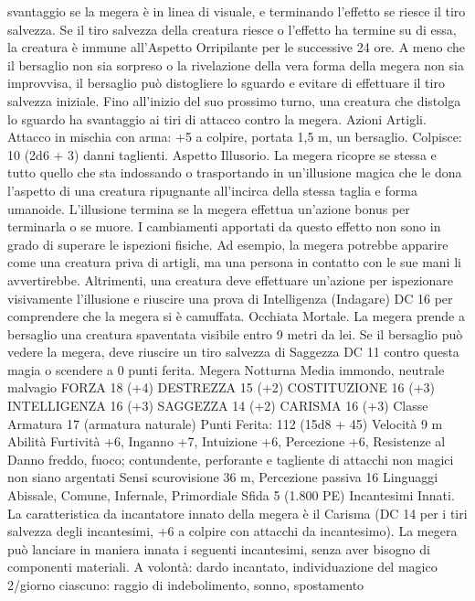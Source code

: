 \begin{multicols}{2}
svantaggio se la megera è in linea di visuale, e terminando
l’effetto se riesce il tiro salvezza. Se il tiro salvezza della creatura
riesce o l’effetto ha termine su di essa, la creatura è immune
all’Aspetto Orripilante per le successive 24 ore.
A meno che il bersaglio non sia sorpreso o la rivelazione della
vera forma della megera non sia improvvisa, il bersaglio può
distogliere lo sguardo e evitare di effettuare il tiro salvezza
iniziale. Fino all’inizio del suo prossimo turno, una creatura che
distolga lo sguardo ha svantaggio ai tiri di attacco contro la
megera.
Azioni
Artigli. Attacco in mischia con arma: +5 a colpire, portata 1,5 m,
un bersaglio.
Colpisce: 10 (2d6 + 3) danni taglienti.
Aspetto Illusorio. La megera ricopre se stessa e tutto quello che
sta indossando o trasportando in un’illusione magica che le dona
l’aspetto di una creatura ripugnante all’incirca della stessa taglia
e forma umanoide. L’illusione termina se la megera effettua
un’azione bonus per terminarla o se muore.
I cambiamenti apportati da questo effetto non sono in grado di
superare le ispezioni fisiche. Ad esempio, la megera potrebbe
apparire come una creatura priva di artigli, ma una persona in
contatto con le sue mani li avvertirebbe. Altrimenti, una creatura
deve effettuare un’azione per ispezionare visivamente l’illusione
e riuscire una prova di Intelligenza (Indagare) DC 16 per
comprendere che la megera si è camuffata.
Occhiata Mortale. La megera prende a bersaglio una creatura
spaventata visibile entro 9 metri da lei. Se il bersaglio può vedere
la megera, deve riuscire un tiro salvezza di Saggezza DC 11
contro questa magia o scendere a 0 punti ferita.
Megera Notturna
Media immondo, neutrale malvagio
FORZA 18 (+4)
DESTREZZA 15 (+2)
COSTITUZIONE 16 (+3)
INTELLIGENZA 16 (+3)
SAGGEZZA 14 (+2)
CARISMA 16 (+3)
Classe Armatura 17 (armatura naturale)
\hspace*{0pt}\hfill{Punti Ferita}: 112 (15d8 + 45)
Velocità 9 m
Abilità Furtività +6, Inganno +7, Intuizione +6, Percezione +6,
Resistenze al Danno freddo, fuoco; contundente, perforante e
tagliente di attacchi non magici non siano argentati
Sensi scurovisione 36 m, Percezione passiva 16
Linguaggi Abissale, Comune, Infernale, Primordiale
Sfida 5 (1.800 PE)
Incantesimi Innati. La caratteristica da incantatore innato della
megera è il Carisma (DC 14 per i tiri salvezza degli incantesimi,
+6 a colpire con attacchi da incantesimo). La megera può
lanciare in maniera innata i seguenti incantesimi, senza aver
bisogno di componenti materiali.
A volontà: dardo incantato, individuazione del magico
2/giorno ciascuno: raggio di indebolimento, sonno, spostamento

\end{multicols}
